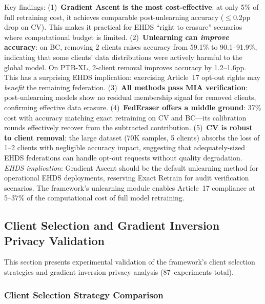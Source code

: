 \documentclass[conference]{IEEEtran}
\begin{document}
\begin{table}[htbp]
\vspace{1mm}
\footnotesize{Key findings: (1)~\textbf{Gradient Ascent is the most cost-effective}: at only 5\% of full retraining cost, it achieves comparable post-unlearning accuracy ($\leq$0.2pp drop on CV). This makes it practical for EHDS ``right to erasure'' scenarios where computational budget is limited. (2)~\textbf{Unlearning can \textit{improve} accuracy}: on BC, removing 2 clients raises accuracy from 59.1\% to 90.1--91.9\%, indicating that some clients' data distributions were actively harmful to the global model. On PTB-XL, 2-client removal improves accuracy by 1.2--1.6pp. This has a surprising EHDS implication: exercising Article~17 opt-out rights may \textit{benefit} the remaining federation. (3)~\textbf{All methods pass MIA verification}: post-unlearning models show no residual membership signal for removed clients, confirming effective data erasure. (4)~\textbf{FedEraser offers a middle ground}: 37\% cost with accuracy matching exact retraining on CV and BC---its calibration rounds effectively recover from the subtracted contribution. (5)~\textbf{CV is robust to client removal}: the large dataset (70K samples, 5 clients) absorbs the loss of 1--2 clients with negligible accuracy impact, suggesting that adequately-sized EHDS federations can handle opt-out requests without quality degradation. \textit{EHDS implication}: Gradient Ascent should be the default unlearning method for operational EHDS deployments, reserving Exact Retrain for audit verification scenarios. The framework's unlearning module enables Article~17 compliance at 5--37\% of the computational cost of full model retraining.}
\end{table}


\subsection{Client Selection and Gradient Inversion Privacy Validation}
\label{sec:cascade5}

This section presents experimental validation of the framework's client selection strategies and gradient inversion privacy analysis (87~experiments total).

\subsubsection{Client Selection Strategy Comparison}
\label{sec:client_selection}
\end{document}
